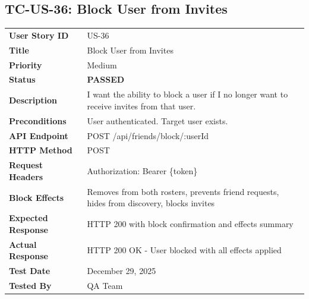 \documentclass[11pt,a4paper]{article}
\newcommand{\passed}{\textcolor{pass}{\textbf{PASSED}}}
\begin{document}
\vspace{0.5cm}


\subsection{TC-US-36: Block User from Invites}

\begin{tabularx}{\textwidth}{|p{3.2cm}|Y|}
\hline
{}
 \\
\hline
\textbf{User Story ID} & US-36 \\
\hline
\textbf{Title} & Block User from Invites \\
\hline
\textbf{Priority} & Medium \\
\hline
\textbf{Status} & \passed \\
\hline
\textbf{Description} & I want the ability to block a user if I no longer want to receive invites from that user. \\
\hline
\textbf{Preconditions} & User authenticated. Target user exists. \\
\hline
\textbf{API Endpoint} & POST /api/friends/block/:userId \\
\hline
\textbf{HTTP Method} & POST \\
\hline
\textbf{Request Headers} & Authorization: Bearer \{token\} \\
\hline
\textbf{Block Effects} & Removes from both rosters, prevents friend requests, hides from discovery, blocks invites \\
\hline
\textbf{Expected Response} & HTTP 200 with block confirmation and effects summary \\
\hline
\textbf{Actual Response} & HTTP 200 OK - User blocked with all effects applied \\
\hline
\textbf{Test Date} & December 29, 2025 \\
\hline
\textbf{Tested By} & QA Team \\
\hline
\end{tabularx}
\end{document}

